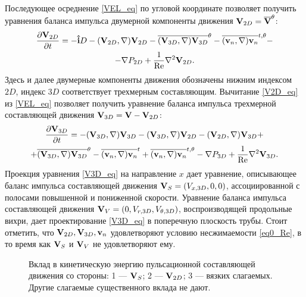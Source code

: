 Последующее осреднение \eqref{VEL_eq} по угловой координате позволяет получить уравнения баланса импульса двумерной компоненты движения $\mathbf{V}_{2D} = \overline{\mathbf{V}}^\theta$:
\begin{multline} \label{V2D_eq}
\frac{\partial \mathbf{V}_{2D}}{\partial t} =  - \mathbf{\hat{i}} D - (\mathbf{V}_{2D}, \nabla) \mathbf{V}_{2D} - \overline{(\mathbf{V}_{3D}, \nabla) \mathbf{V}_{3D}}^{\theta} - \overline{(\mathbf{v}_n, \nabla) \mathbf{v}_n}^{t,\theta} - \\ - \nabla P_{2D} + \frac{1}{\operatorname{Re}} \nabla^2 \mathbf{V}_{2D}.
\end{multline}
Здесь и далее двумерные компоненты движения обозначены нижним индексом $2D$, индекс $3D$ соответствует трехмерным составляющим. Вычитание \eqref{V2D_eq} из \eqref{VEL_eq} позволяет получить уравнение баланса импульса трехмерной составляющей движения $\mathbf{V}_{3D} = \mathbf{V} - \mathbf{V}_{2D}$:
\begin{multline} \label{V3D_eq}
\frac{\partial \mathbf{V}_{3D}}{\partial t} =  - (\mathbf{V}_{3D}, \nabla) \mathbf{V}_{3D} - (\mathbf{V}_{3D}, \nabla) \mathbf{V}_{2D} - (\mathbf{V}_{2D}, \nabla) \mathbf{V}_{3D} + \\ + \overline{(\mathbf{V}_{3D}, \nabla) \mathbf{V}_{3D}}^{\theta} - \overline{(\mathbf{v}_n, \nabla) \mathbf{v}_n}^{t} + \overline{(\mathbf{v}_n, \nabla) \mathbf{v}_n}^{t, \theta} - \nabla P_{3D} + \frac{1}{\operatorname{Re}} \nabla^2 \mathbf{V}_{3D}.
\end{multline}
Проекция уравнения \eqref{V3D_eq} на направление $x$ дает уравнение, описывающее баланс импульса составляющей движения $\mathbf{V}_S = (V_{x,3D}, 0, 0)$, ассоциированной с полосами повышенной и пониженной скорости. Уравнение баланса импульса составляющей движения $\mathbf{V}_V = (0, V_{r,3D}, V_{\theta,3D})$, воспроизводящей продольные вихри, дает проектирование \eqref{V3D_eq} в поперечную плоскость трубы. Стоит отметить, что $\mathbf{V}_{2D}, \mathbf{V}_{3D}, \mathbf{v}_n$ удовлетворяют условию несжимаемости \eqref{eq0_Re}, в то время как $\mathbf{V}_S$ и $\mathbf{V}_V$ не удовлетворяют ему. 
 

\begin{figure}
\caption{Вклад в кинетическую энергию пульсационной составляющей движения со стороны: 1 --- $\mathbf{V}_S$; 2 --- $\mathbf{V}_{2D}$; 3 --- вязких слагаемых. Другие слагаемые существенного вклада не дают.}
\label{e1_parts_pic}
\end{figure}



